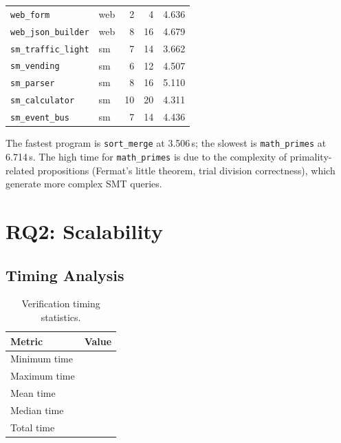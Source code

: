 \documentclass[11pt]{article}
\begin{document}
\begin{table}[H]
\begin{tabular}{@{}l l r r r@{}}
\texttt{web\_form}         & web  & 2  & 4  & 4.636 \\
\texttt{web\_json\_builder}& web  & 8  & 16 & 4.679 \\
\midrule
\texttt{sm\_traffic\_light}& sm   & 7  & 14 & 3.662 \\
\texttt{sm\_vending}       & sm   & 6  & 12 & 4.507 \\
\texttt{sm\_parser}        & sm   & 8  & 16 & 5.110 \\
\texttt{sm\_calculator}    & sm   & 10 & 20 & 4.311 \\
\texttt{sm\_event\_bus}    & sm   & 7  & 14 & 4.436 \\
\bottomrule
\end{tabular}
\end{table}

The fastest program is \texttt{sort\_merge} at 3.506\,s; the slowest
is \texttt{math\_primes} at 6.714\,s.  The high time for
\texttt{math\_primes} is due to the complexity of primality-related
propositions (Fermat's little theorem, trial division correctness),
which generate more complex SMT queries.

\section{RQ2: Scalability}\label{sec:rq2}

\subsection{Timing Analysis}

\begin{table}[H]
\centering
\caption{Verification timing statistics.}\label{tab:timing}
\begin{tabular}{@{}l r@{}}
\toprule
\textbf{Metric} & \textbf{Value} \\
\midrule
Minimum time   & \expTimeMin{} \\
Maximum time   & \expTimeMax{} \\
Mean time      & \expTimeMean{} \\
Median time    & \expTimeMedian{} \\
Total time     & \expTimeTotal{} \\
\bottomrule
\end{tabular}
\end{table}
\end{document}
